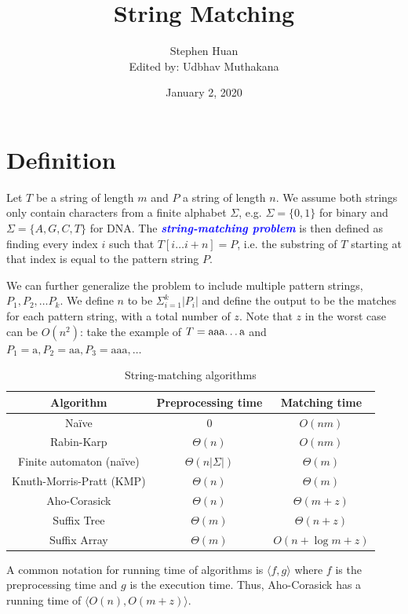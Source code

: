 \documentclass[11pt, oneside]{article}
\title{String Matching}
\author{Stephen Huan \\ Edited by: Udbhav Muthakana}
\date{January 2, 2020}
\newcommand{\emphasis}[1]{\textcolor{blue}{\textbf{\textit{#1}}}}
\begin{document}
\maketitle

\section{Definition}
Let \( T \) be a string of length \( m \) and \( P \) a string of length \( n \).
We assume both strings only contain characters from a finite alphabet \( \Sigma \),
e.g. \( \Sigma = \{ 0, 1 \} \) for binary and \( \Sigma = \{ A, G, C, T \} \) for DNA.
The \emphasis{string-matching problem} is then defined as finding every index \( i \)
such that \( T[i \dots i + n] = P \), i.e. the substring of \( T \) starting at that index is
equal to the pattern string \( P \).

We can further generalize the problem to include multiple pattern strings, \( P_1, P_2, \dots P_k \). We define \( n \) to be \( \Sigma^{k}_{i = 1} |P_i| \) and define the output to be the matches for each pattern string, with a total number of \( z \). Note that \( z \) in the worst case can be
\( O(n^2) \): take the example of \( T = \text{aaa\dots a} \) and \( P_1 = \text{a}, P_2 = \text{aa}, P_3 = \text{aaa}, \dots \)

\begin{table}[h!]
\centering
\begin{tabular}{ ccc }
 Algorithm & Preprocessing time & Matching time \\
 \hline
 Naïve & \( 0 \) & \( O(nm) \) \\
 Rabin-Karp & \( \Theta(n) \) & \( O(nm) \) \\
 Finite automaton (naïve) & \( \Theta(n|\Sigma|) \) & \( \Theta(m) \) \\
 Knuth-Morris-Pratt (KMP) & \( \Theta(n) \) & \( \Theta(m) \) \\
 Aho-Corasick & \( \Theta(n) \) & \( \Theta(m + z) \) \\
 Suffix Tree & \( \Theta(m) \) & \( \Theta(n + z) \) \\
 Suffix Array & \( \Theta(m) \) & \( O(n + \log m + z) \) \\
 \hline
\end{tabular}
\caption{String-matching algorithms}
\end{table}

A common notation for running time of algorithms is \( \langle f, g \rangle \)
where \( f \) is the preprocessing time and \( g \) is the execution time. Thus, Aho-Corasick has a running time of \( \langle O(n), O(m + z) \rangle \).
\end{document}
